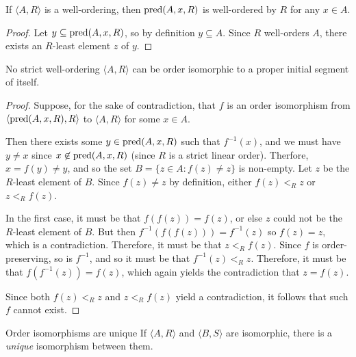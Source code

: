 \begin{lemma}
    If $\langle A, R \rangle$ is a well-ordering, then $\operatorname{pred}(A, x, R)$ is well-ordered by $R$ for any $x \in A$.
\end{lemma}

\begin{proof}
    Let $y \subseteq \operatorname{pred}(A, x, R)$, so by definition $y \subseteq A$. Since $R$ well-orders $A$, there exists an $R$-least element $z$ of $y$. 
\end{proof}

\begin{lemma}\label{lemma:pis-iso}
    No strict well-ordering $\langle A, R \rangle$ can be order isomorphic to a proper initial segment of itself.
\end{lemma}

\begin{proof}
    Suppose, for the sake of contradiction, that $f$ is an order isomorphism from $\langle \operatorname{pred}(A, x, R), R\rangle$ to $\langle A, R \rangle$ for some $x \in A$.

    Then there exists some $y \in \operatorname{pred}(A, x, R)$ such that $f^{-1}(x)$, and we must have $y \neq x$ since $x \not\in \operatorname{pred}(A, x, R)$ (since $R$ is a strict linear order). Therfore, $x = f(y) \neq y$, and so the set $B = \{z \in A : f(z) \neq z\}$ is non-empty. Let $z$ be the $R$-least element of $B$. Since $f(z) \neq z$ by definition, either $f(z) <_{R} z$ or $z <_{R} f(z)$.

    In the first case, it must be that $f(f(z)) = f(z)$, or else $z$ could not be the $R$-least element of $B$. But then $f^{-1}(f(f(z))) = f^{-1}(z)$ so $f(z) = z$, which is a contradiction. Therefore, it must be that $z <_{R} f(z)$. Since $f$ is order-preserving, so is $f^{-1}$, and so it must be that $f^{-1}(z) <_{R} z$. Therefore, it must be that $f(f^{-1}(z)) = f(z)$, which again yields the contradiction that $z = f(z)$.

    Since both $f(z) <_{R} z$ and $z <_{R} f(z)$ yield a contradiction, it follows that such $f$ cannot exist.
\end{proof}

\begin{thm}{Order isomorphisms are unique}\label{thm:unique-order-isomorphisms}\proofbreak
    If $\langle A, R \rangle$ and $\langle B, S\rangle$ are isomorphic, there is a \emph{unique} isomorphism between them.
\end{thm}

